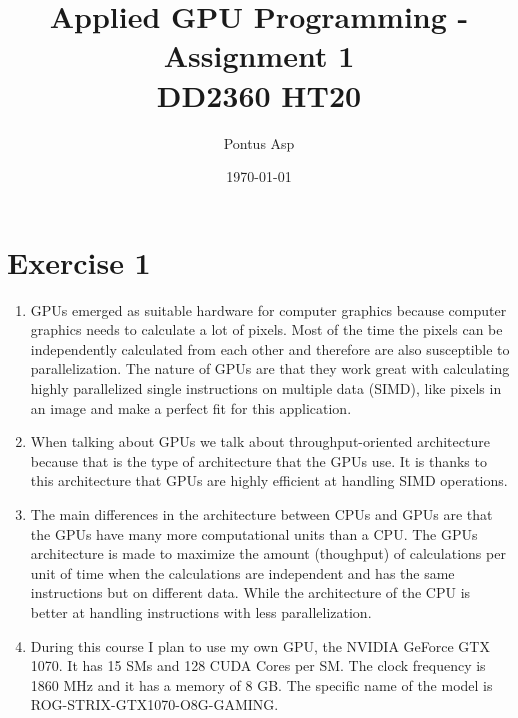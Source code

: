 \documentclass[a4paper, 12pt]{article}
\begin{document}
\title{\vspace{4.0cm}Applied GPU Programming - Assignment 1\\
\large DD2360 HT20}
\author{Pontus Asp}
\date{\today}
\maketitle
\thispagestyle{empty}
\newpage

\tableofcontents
\newpage

\clearpage
{}

\section{Exercise 1}
\begin{enumerate}
	\item GPUs emerged as suitable hardware for computer graphics because computer graphics needs to calculate a lot of pixels. Most of the time the pixels can be independently calculated from each other and therefore are also susceptible to parallelization. The nature of GPUs are that they work great with calculating highly parallelized single instructions on multiple data (SIMD), like pixels in an image and make a perfect fit for this application.
	
	\item When talking about GPUs we talk about throughput-oriented architecture because that is the type of architecture that the GPUs use. It is thanks to this architecture that GPUs are highly efficient at handling SIMD operations.
	
	\item The main differences in the architecture between CPUs and GPUs are that the GPUs have many more computational units than a CPU. The GPUs architecture is made to maximize the amount (thoughput) of calculations per unit of time when the calculations are independent and has the same instructions but on different data. While the architecture of the CPU is better at handling instructions with less parallelization.
	
	\item During this course I plan to use my own GPU, the NVIDIA GeForce GTX 1070. It has 15 SMs and 128 CUDA Cores per SM. The clock frequency is 1860 MHz and it has a memory of 8 GB. The specific name of the model is ROG-STRIX-GTX1070-O8G-GAMING.	
	

\end{enumerate}
\end{document}
